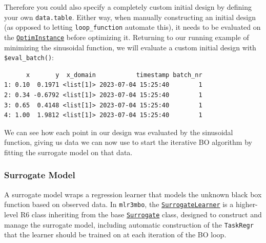 Therefore you could also specify a completely custom initial design by
defining your own \texttt{data.table}. Either way, when manually
constructing an initial design (as opposed to letting
\texttt{loop\_function} automate this), it needs to be evaluated on the
\href{https://bbotk.mlr-org.com/reference/OptimInstance.html}{\texttt{OptimInstance}}
before optimizing it. Returning to our running example of minimizing the
sinusoidal function, we will evaluate a custom initial design with
\texttt{\$eval\_batch()}:

\begin{Shaded}
\begin{Highlighting}[]
\OtherTok{=}\SpecialCharTok{$}
   \NormalTok{(}\NormalTok{, } \NormalTok{))}
\OtherTok{=} \NormalTok{(} \NormalTok{(}\NormalTok{, }\NormalTok{, }\NormalTok{, }\NormalTok{))}
\SpecialCharTok{$}
\SpecialCharTok{$}\SpecialCharTok{$}
\end{Highlighting}
\end{Shaded}

\begin{verbatim}
      x       y  x_domain           timestamp batch_nr
1: 0.10  0.1971 <list[1]> 2023-07-04 15:25:40        1
2: 0.34 -0.6792 <list[1]> 2023-07-04 15:25:40        1
3: 0.65  0.4148 <list[1]> 2023-07-04 15:25:40        1
4: 1.00  1.9812 <list[1]> 2023-07-04 15:25:40        1
\end{verbatim}

We can see how each point in our design was evaluated by the sinusoidal
function, giving us data we can now use to start the iterative BO
algorithm by fitting the surrogate model on that data.

\hypertarget{sec-bayesian-optimization-surrogate}{%
\subsubsection{Surrogate
Model}\label{sec-bayesian-optimization-surrogate}}

A surrogate model wraps a regression learner that
models the unknown black box function based on observed data. In
\texttt{mlr3mbo}, the
\href{https://mlr3mbo.mlr-org.com/reference/SurrogateLearner.html}{\texttt{SurrogateLearner}}
is a higher-level R6 class inheriting from the base
\href{https://mlr3mbo.mlr-org.com/reference/Surrogate.html}{\texttt{Surrogate}}
class, designed to construct and manage the surrogate model, including
automatic construction of the \texttt{TaskRegr} that the learner should
be trained on at each iteration of the BO loop.

